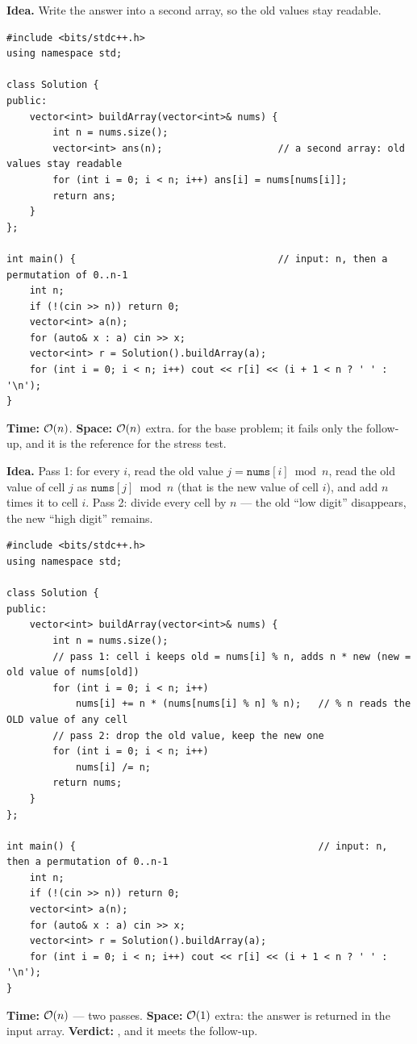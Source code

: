 \begin{bruteforcebox}
\textbf{Idea.} Write the answer into a second array, so the old values stay readable.
\begin{lstlisting}[style=cpp]
#include <bits/stdc++.h>
using namespace std;

class Solution {
public:
    vector<int> buildArray(vector<int>& nums) {
        int n = nums.size();
        vector<int> ans(n);                    // a second array: old values stay readable
        for (int i = 0; i < n; i++) ans[i] = nums[nums[i]];
        return ans;
    }
};

int main() {                                   // input: n, then a permutation of 0..n-1
    int n;
    if (!(cin >> n)) return 0;
    vector<int> a(n);
    for (auto& x : a) cin >> x;
    vector<int> r = Solution().buildArray(a);
    for (int i = 0; i < n; i++) cout << r[i] << (i + 1 < n ? ' ' : '\n');
}
\end{lstlisting}
\begin{complexitybox}
\textbf{Time:} $\mathcal{O}(n)$. \textbf{Space:} $\mathcal{O}(n)$ extra. \ac{} for the base problem; it fails only the follow-up, and it is the reference for the stress test.
\end{complexitybox}
\end{bruteforcebox}

\begin{algorithmbox}
\textbf{Idea.} Pass 1: for every $i$, read the old value $j = \texttt{nums}[i] \bmod n$, read the old value of cell $j$ as $\texttt{nums}[j] \bmod n$ (that is the new value of cell $i$), and add $n$ times it to cell $i$. Pass 2: divide every cell by $n$ --- the old ``low digit'' disappears, the new ``high digit'' remains.
\begin{lstlisting}[style=cpp]
#include <bits/stdc++.h>
using namespace std;

class Solution {
public:
    vector<int> buildArray(vector<int>& nums) {
        int n = nums.size();
        // pass 1: cell i keeps old = nums[i] % n, adds n * new (new = old value of nums[old])
        for (int i = 0; i < n; i++)
            nums[i] += n * (nums[nums[i] % n] % n);   // % n reads the OLD value of any cell
        // pass 2: drop the old value, keep the new one
        for (int i = 0; i < n; i++)
            nums[i] /= n;
        return nums;
    }
};

int main() {                                          // input: n, then a permutation of 0..n-1
    int n;
    if (!(cin >> n)) return 0;
    vector<int> a(n);
    for (auto& x : a) cin >> x;
    vector<int> r = Solution().buildArray(a);
    for (int i = 0; i < n; i++) cout << r[i] << (i + 1 < n ? ' ' : '\n');
}
\end{lstlisting}
\begin{complexitybox}
\textbf{Time:} $\mathcal{O}(n)$ --- two passes. \textbf{Space:} $\mathcal{O}(1)$ extra: the answer is returned in the input array. \textbf{Verdict:} \ac{}, and it meets the follow-up.
\end{complexitybox}
\end{algorithmbox}


